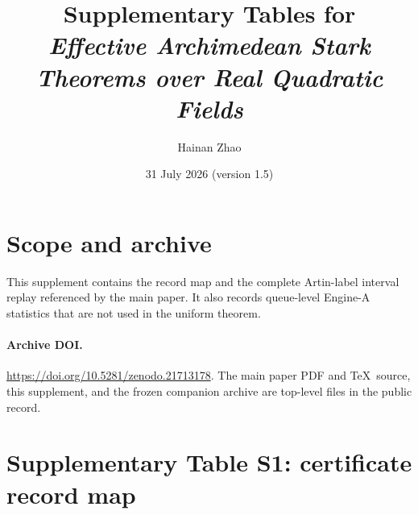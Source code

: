 \documentclass[11pt]{article}
\title{Supplementary Tables for\\
\emph{Effective Archimedean Stark Theorems over Real Quadratic Fields}}
\author{Hainan Zhao}
\date{31 July 2026 (version 1.5)}
\begin{document}
\maketitle

\section*{Scope and archive}

This supplement contains the record map and the complete
Artin-label interval replay referenced by the main paper.  It also
records queue-level Engine-A statistics that are not used in the
uniform theorem.

\paragraph{Archive DOI.}
\url{https://doi.org/10.5281/zenodo.21713178}.  The main paper PDF and
\TeX\ source, this supplement, and the frozen companion archive are
top-level files in the public record.

\section*{Supplementary Table S1: certificate record map}
\end{document}
